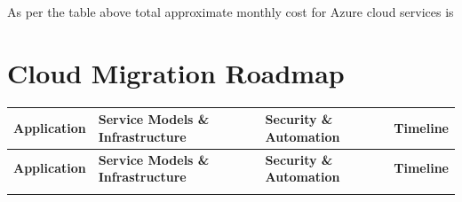 \documentclass{llncs}
\begin{document}
As per the table above total approximate monthly cost for Azure cloud services is 
\newpage
\section*{Cloud Migration Roadmap}

\begin{longtable}{|p{3.1cm}|p{5.2cm}|p{3.1cm}|l|}
    \hline
    \textbf{Application} & \textbf{Service Models \& Infrastructure} & \textbf{Security \& Automation} & \textbf{Timeline} \\
    \hline
    \endfirsthead
    \hline
    \textbf{Application} & \textbf{Service Models \& Infrastructure} & \textbf{Security \& Automation} & \textbf{Timeline} \\
    \hline
    \endhead
    \hline
    \endfoot
    \hline
    

\end{longtable}
\end{document}
